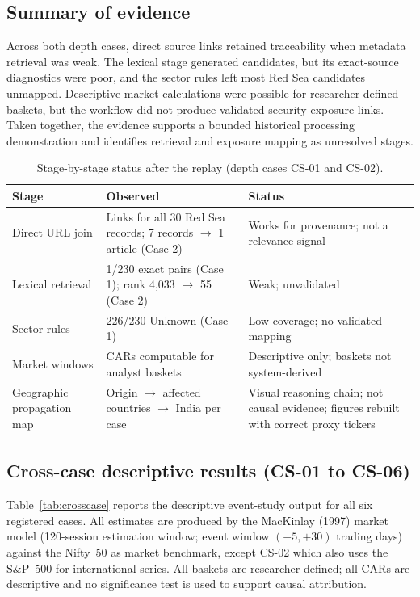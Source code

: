 \documentclass[10pt,a4paper,twocolumn]{article}
\begin{document}
\subsection{Summary of evidence}

Across both depth cases, direct source links retained traceability when metadata retrieval was weak. The lexical stage generated candidates, but its exact-source diagnostics were poor, and the sector rules left most Red Sea candidates unmapped. Descriptive market calculations were possible for researcher-defined baskets, but the workflow did not produce validated security exposure links. Taken together, the evidence supports a bounded historical processing demonstration and identifies retrieval and exposure mapping as unresolved stages.

\begin{table}[t]
\centering
\caption{Stage-by-stage status after the replay (depth cases CS-01 and CS-02).}
\label{tab:status}
\small
\begin{tabular}{p{3.4cm}p{4.2cm}p{5.8cm}}
\toprule
\textbf{Stage} & \textbf{Observed} & \textbf{Status} \\
\midrule
Direct URL join & Links for all 30 Red Sea records; 7 records $\to$ 1 article (Case 2) & Works for provenance; not a relevance signal \\
Lexical retrieval & 1/230 exact pairs (Case 1); rank 4{,}033 $\to$ 55 (Case 2) & Weak; unvalidated \\
Sector rules & 226/230 Unknown (Case 1) & Low coverage; no validated mapping \\
Market windows & CARs computable for analyst baskets & Descriptive only; baskets not system-derived \\
Geographic propagation map & Origin $\to$ affected countries $\to$ India per case & Visual reasoning chain; not causal evidence; figures rebuilt with correct proxy tickers \\
\bottomrule
\end{tabular}
\end{table}

\subsection{Cross-case descriptive results (CS-01 to CS-06)}\label{sec:crosscase}

Table~\ref{tab:crosscase} reports the descriptive event-study output for all six registered cases. All estimates are produced by the MacKinlay (1997) market model (120-session estimation window; event window $(-5,+30)$ trading days) against the Nifty~50 as market benchmark, except CS-02 which also uses the S\&P~500 for international series. All baskets are researcher-defined; all CARs are descriptive and no significance test is used to support causal attribution.
\end{document}
